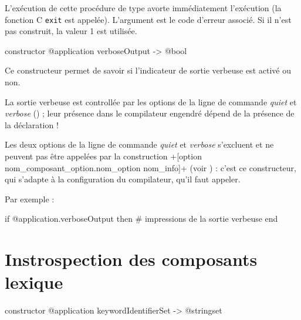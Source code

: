 L'exécution de cette procédure de type avorte immédiatement l'exécution (la fonction C \texttt{exit} est appelée). L'argument est le code d'erreur associé. Si il n'est pas construit, la valeur 1 est utilisée.










\begin{galgas3box}
constructor @application verboseOutput -> @bool
\end{galgas3box}

Ce constructeur permet de savoir si l'indicateur de sortie verbeuse est activé ou non.

La sortie verbeuse est controllée par les options de la ligne de commande \emph{quiet} et \emph{verbose} () ; leur présence dans le compilateur engendré dépend de la présence de la déclaration \ggst!%

Les deux options de la ligne de commande \emph{quiet} et \emph{verbose} s'excluent et ne peuvent pas être appelées par la construction \ggst+[option nom_composant_option.nom_option nom_info]+ (voir ) : c'est ce constructeur, qui s'adapte à la configuration du compilateur, qu'il faut appeler.

Par exemple :
\begin{galgas3}
if @application.verboseOutput then
  # impressions de la sortie verbeuse
end
\end{galgas3}














\section{Instrospection des composants lexique}


\begin{galgas3box}
constructor @application keywordIdentifierSet -> @stringset
\end{galgas3box}


